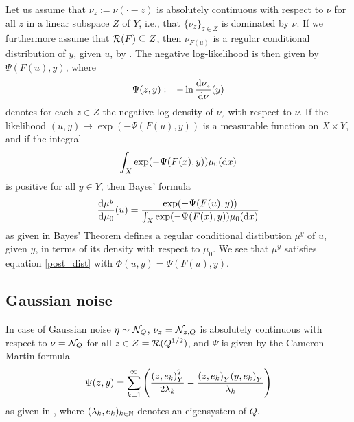 \documentclass[english]{jnsao}
\theoremstyle{definition}
\begin{document}
Let us assume that $\nu_z := \nu(\cdot - z)$ is absolutely continuous with respect to $\nu$ for all $z$ in a linear subspace $Z$ of $Y$, i.e., that $\{\nu_z\}_{z \in Z}$ is dominated by $\nu$.
If we furthermore assume that $\operatorname{\mathcal{R}}(F) \subseteq Z$, then $\nu_{F(u)}$ is a regular conditional distribution of $y$, given $u$, by \cite[Prop.~1.4]{Kretschmann:2019}.
The negative log-likelihood is then given by $\Psi(F(u),y)$, where
\[
	\Psi(z,y) := -\ln \frac{\mathrm{d}\nu_z}{\mathrm{d}\nu}(y)
\]
denotes for each $z \in Z$ the negative log-density of $\nu_z$ with respect to $\nu$.
If the likelihood $(u,y) \mapsto \exp(-\Psi(F(u),y))$ is a measurable function on $X \times Y$, and if the integral
\[
	\int_{X} \exp(-\Psi(F(x),y)) \mu_0(\mathrm{d} x)
\]
is positive for all $y \in Y$, then Bayes' formula 
\[
	\frac{\mathrm{d}\mu^y}{\mathrm{d}\mu_0}(u) 
	= \frac{\exp(-\Psi(F(u),y))}{\int_{X} \exp(-\Psi(F(x),y)) \mu_0(\mathrm{d} x)}
\]
as given in Bayes' Theorem \cite[Thm.~1.3]{Kretschmann:2019} defines a regular conditional distibution $\mu^y$ of $u$, given $y$, in terms of its density with respect to $\mu_0$.
We see that $\mu^y$ satisfies equation \eqref{post_dist} with $\Phi(u,y) = \Psi(F(u),y)$.


\subsection{Gaussian noise}
\label{sec:gaussian_noise}
In case of Gaussian noise $\eta \sim \mathcal{N}_Q$, $\nu_z = \mathcal{N}_{z,Q}$ is absolutely continuous with respect to $\nu = \mathcal{N}_Q$ for all $z \in Z = \operatorname{\mathcal{R}}(Q^{1/2})$, and $\Psi$ is given by the Cameron--Martin formula
\[
	\Psi(z,y) = \sum_{k=1}^\infty \left( \frac{{(z,e_k)}_Y^2}{2\lambda_k} - \frac{{(z,e_k)}_Y{(y,e_k)}_Y}{\lambda_k} \right)
\]
as given in \cite[Thm.~2.3.1]{DaPrato:2001}, where $(\lambda_k, e_k)_{k\in\mathbb{N}}$ denotes an eigensystem of $Q$. 
\end{document}
